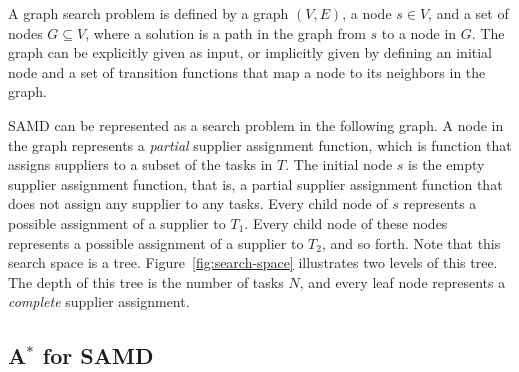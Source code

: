 \documentclass[letterpaper]{article}
\newcommand{\samd}{\ac{SAMD}\xspace}
\begin{document}
A graph search problem is defined by a graph $(V,E)$,
a node $s\in V$, and a set of nodes $G\subseteq V$,
where a solution is a path in the graph from $s$ to a node in $G$.
The graph can be explicitly given as input, or implicitly given
by defining an initial node and a set of transition functions
that map a node to its neighbors in the graph.

\samd can be represented as a search problem in the following graph. A node in the graph represents a \emph{partial} supplier assignment function,
which is function that assigns suppliers to a subset of the tasks in $T$.
The initial node $s$ is the empty supplier assignment function, that is, a partial supplier assignment function that does not assign any supplier to any tasks.
Every child node of $s$ represents a possible assignment of a supplier to $T_1$.
Every child node of these nodes represents a possible assignment of a supplier to $T_2$,
and so forth. Note that this search space is a tree. Figure~\ref{fig:search-space} illustrates two levels of this tree.
The depth of this tree is the number of tasks $N$, and every leaf node represents a \emph{complete} supplier assignment.


\subsection{A$^*$ for \samd}
\label{sec:astar}
\end{document}
